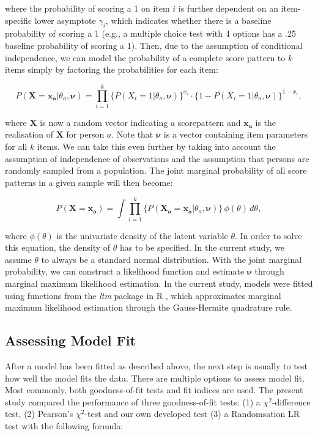 \documentclass[Royal,sageapa,times,doublespace]{sagej}
\begin{document}
where the probability of scoring a 1 on item $i$ is further dependent on an item-specific lower asymptote $\gamma_i$, which indicates whether there is
a baseline probability of scoring a 1 (e.g., a multiple choice test with 4 options has a .25 baseline probability of scoring a 1). Then, due to the assumption of conditional independence, we can model the probability of a complete score pattern to $k$ items simply by factoring the probabilities for each item:

\begin{equation}
P(\boldsymbol{X} = \boldsymbol{x_a} | \theta_a, \boldsymbol{\nu}) = \prod_{i=1}^{k} \{P(X_i = 1 | \theta_a, \boldsymbol{\nu})\}^{x_i} \cdot  \{1 - P(X_i = 1 | \theta_a, \boldsymbol{\nu}) \}^{1 - x_i},
\end{equation}

where $\boldsymbol{X}$ is now a random vector indicating a scorepattern and $\boldsymbol{x_a}$ is the realisation of $\boldsymbol{X}$ for person $a$. Note that $\boldsymbol{\nu}$ is a vector containing item parameters for all $k$ items. We can take this even further by taking into account the assumption of independence of observations and the assumption that persons are randomly sampled from a population. The joint marginal probability of all score patterns in a given sample will then become:

\begin{equation}
P(\boldsymbol{X} = \boldsymbol{x_a}) = \int \prod_{i=1}^{k} \{ P(\boldsymbol{X_a} = \boldsymbol{x_a} | \theta_a, \boldsymbol{\nu}) \} \,\phi(\theta)\,d\theta,
\end{equation}

where $\phi(\theta)$ is the univariate density of the latent variable $\theta$. In order to solve this equation, the density of $\theta$ has to be specified. In the current study, we assume $\theta$ to always be a standard normal distribution. With the joint marginal probability, we can construct a likelihood function and estimate $\boldsymbol{\nu}$ through marginal maximum likelihood estimation. In the current study, models were fitted using functions from the \textit{ltm} package in R \cite{ltmpack}, which approximates marginal maximum likelihood estimation through the Gauss-Hermite quadrature rule.

\subsection{Assessing Model Fit}
\indent After a model has been fitted as described above, the next step is usually to test how well the model fits the data. There are multiple options to assess model fit. Most commonly, both goodness-of-fit tests and fit indices are used. The present study compared the performance of three goodness-of-fit tests: (1) a $\chi^2$-difference test, (2) Pearson's $\chi^2$-test and our own developed test (3) a Randomsation LR test with the following formula:
\end{document}
